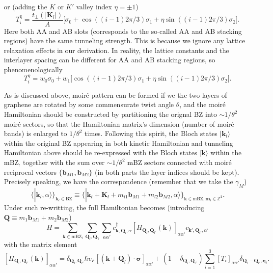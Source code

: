 or (adding the $K$ or $K'$ valley index $\eta=\pm1$)
\begin{equation*}
    T_i^\eta=\frac{t_\perp(|\bm K_l|)}{A}\bigg[\sigma_0+\cos((i-1)2\pi/3)\sigma_1+\eta\sin((i-1)2\pi/3)\sigma_2\bigg].
\end{equation*}
Here both AA and AB slots (corresponds to the so-called AA and AB stacking regions) have the same tunneling strength. This is because we ignore any lattice relaxation effects in our derivation. In reality, the lattice constants and the interlayer spacing can be different for AA and AB stacking regions, so phenomenologically
\begin{equation}\label{eq:interlayer_tunneling_matrices_tBLG}
    T_i^\eta=w_0\sigma_0+w_1\bigg[\cos((i-1)2\pi/3)\sigma_1+\eta\sin((i-1)2\pi/3)\sigma_2\bigg].
\end{equation}

As is discussed above, moir\'e pattern can be formed if we the two layers of graphene are rotated by some commensurate twist angle $\theta$, and the moir\'e Hamiltonian should be constructed by partitioning the orignal BZ into $\sim1/\theta^2$ moir\'e sectors, so that the Hamiltonian matrix's dimension (number of moir\'e bands) is enlarged to $1/\theta^2$ times. Following this spirit, the Bloch states $|\bm k_l\rangle$ within the original BZ appearing in both kinetic Hamiltonian and tunneling Hamiltonian above should be re-expressed with the Bloch states $|\bm k\rangle$ within the mBZ, together with the sum over $\sim 1/\theta^2$ mBZ sectors connected with moir\'e reciprocal vectors $\{\bm b_{M1},\bm b_{M2}\}$ (in both parts the layer indices should be kept). Precisely speaking, we have the correspondence (remember that we take the $\gamma_M$)
\begin{equation*}
    \{|\bm k_l,\alpha\rangle\}_{\bm k_l\in\text{BZ}}\equiv\{|\bm k_l+\bm K_l+m_{l1}\bm b_{M1}+m_{l2}\bm b_{M2},\alpha\rangle\}_{\bm k\in\text{mBZ},\bm m_l\in\mathbb Z^2}.
\end{equation*}
Under such re-writting, the full Hamiltonian becomes (introducing $\bm Q\equiv m_1\bm b_{M1}+m_2\bm b_{M2}$)
\begin{equation*}
    H=\sum_{\bm k\in\text{mBZ}_l}\sum_{\bm Q_l,\bm Q_{'l}}\sum_{\alpha\alpha'} c_{\bm k,\bm Q_l,\alpha}^\dagger [H_{\bm Q_l,\bm Q_{l'}}(\bm k)]_{\alpha\alpha'} c_{\bm k',\bm Q_{l'},\alpha'}
\end{equation*}
with the matrix element
\begin{equation}\label{eq:tBLG_full_Hamiltonian_matrix}
    [H_{\bm Q_l,\bm Q_{l'}}(\bm k)]_{\alpha\alpha'} = \delta_{\bm Q_l,\bm Q_{l'}}\hbar v_F [(\bm k+\bm Q_l)\cdot\bm\sigma]_{\alpha\alpha'} + (1-\delta_{\bm Q_l,\bm Q_{l'}})\sum_{i=1}^3[T_i]_{\alpha\alpha'}\delta_{\bm Q_l-\bm Q_{l'},\bm q_i}.
\end{equation}

